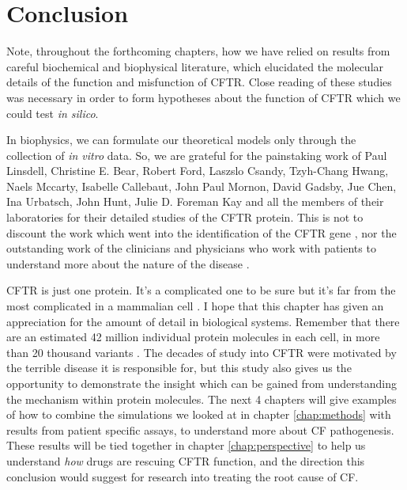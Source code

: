 \section{Conclusion}

Note, throughout the forthcoming chapters, how we have relied on results from careful biochemical and biophysical literature, which elucidated the molecular details of the function and misfunction of CFTR. Close reading of these studies was necessary in order to form hypotheses about the function of CFTR which we could test \textit {in silico}. 

In biophysics, we can formulate our theoretical models only through the collection of \textit{in vitro} data. So, we are grateful for the painstaking work of Paul Linsdell, Christine E. Bear, Robert Ford, Laszslo Csandy, Tzyh-Chang Hwang, Naels Mccarty, Isabelle Callebaut, John Paul Mornon, David Gadsby, Jue Chen, Ina Urbatsch, John Hunt, Julie D. Foreman Kay and all the members of their laboratories for their detailed studies of the CFTR protein. This is not to discount the work which went into the identification of the CFTR gene \cite{riordan1989}, nor the outstanding work of the clinicians and physicians who work with patients to understand more about the nature of the disease \cite{roberts1957}.  



CFTR is just one protein. It's a complicated one to be sure but it's far from the most complicated in a mammalian cell \cite{saotome2018, zalk2015, chen2018a}. I hope that this chapter has given an appreciation for the amount of detail in biological systems. Remember that there are an estimated 42 million individual protein molecules in each cell, in more than 20 thousand variants \cite{ho2018, salzberg2018}. The decades of study into CFTR were motivated by the terrible disease it is responsible for, but this study also gives us the opportunity to demonstrate the insight which can be gained from understanding the mechanism within protein molecules. The next 4 chapters will give examples of how to combine the simulations we looked at in chapter \ref{chap:methods} with results from patient specific assays, to understand more about CF pathogenesis. These results will be tied together in chapter \ref{chap:perspective} to help us understand \textit{how} drugs are rescuing CFTR function, and the direction this conclusion would suggest for research into treating the root cause of CF.
